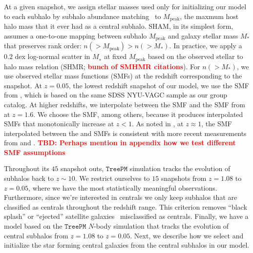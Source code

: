 \documentclass[12pt, letterpaper, preprint]{aastex}
\newcommand{\todo}[1]{{\bf \textcolor{red}{#1}}}
\begin{document}
At a given snapshot, we assign stellar masses used only for initializing
our model to each subhalo by subhalo abundance matching~\citep[SHAM;][]{conroy2006,vale2006,yang2009,wetzel2012,leja2013,wetzel2013,wetzel2014,hahn2017a}
to $M_\mathrm{peak}$, the maxmum host halo mass that it ever had as a 
central subhalo. SHAM, in its simplest form, assumes a one-to-one mapping 
between subhalo $M_\mathrm{peak}$ and galaxy stellar mass $M_*$ that 
preserves rank order: $n(> M_\mathrm{peak}) > n(> M_*)$. In practice, we 
apply a $0.2$ dex log-normal scatter in $M_∗$ at fixed $M_\mathrm{peak}$ 
based on the observed stellar to halo mass relation (SHMR; \todo{bunch of SMHMR citations}). %
For $n(> M_*)$, we use observed stellar mass functions (SMFs) at the redshift 
corresponding to the snapshot. At $z=0.05$, the lowest redshift snapshot of 
our model, we use the SMF from \cite{li2009}, which is based on the same 
SDSS NYU-VAGC sample as our group catalog. At higher redshifts, we interpolate 
between the \cite{li2009} SMF and the SMF from \cite{marchesini2009} at 
$z = 1.6$. We choose the \cite{marchesini2009} SMF, among others, because it 
produces interpolated SMFs that monotonically increase at $z < 1$. As noted 
in \cite{hahn2017a}, at $z \approx 1$, the SMF interpolated between the 
\cite{li2009} and \cite{marchesini2009} SMFs is consistent with more recent 
measurements from \cite{muzzin2013} and \cite{ilbert2013}. 
\todo{TBD: Perhaps mention in appendix how we test different SMF assumptions}%

Throughout its $45$ snapshot outs, $\mathtt{TreePM}$ simulation tracks 
the evolution of subhalos back to $z \sim 10$. We restrict ourselves to $15$ 
snapshots from $z = 1.08$ to $z=0.05$, where we have the most statistically 
meaningful observations. Furthermore, since we're interested in centrals we only 
keep subhalos that are classified as centrals throughout the redshift 
range. This criterion removes ``black splash'' or ``ejected'' satellite 
galaxies~\citep[\emph{e.g.}][]{mamon2004,wetzel2014} misclassified as 
centrals. Finally, we have a model based on the $\mathtt{TreePM}$ $N$-body 
simulation that tracks the evolution of central subhalos from $z = 1.08$ to 
$z=0.05$. Next, we describe how we select and initialize the star forming 
central galaxies from the central subhalos in our model. 

\end{document}
